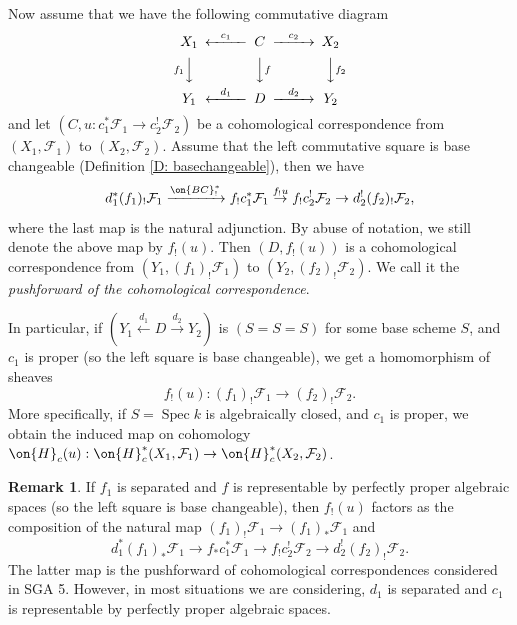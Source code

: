 \documentclass[11pt]{amsart}
\theoremstyle{definition}
\theoremstyle{definition}
\newtheorem{rmk}[thm]{Remark}
\theoremstyle{definition}
\numberwithin{equation}{subsection}
\newcommand{\mF}{{\mathcal F}}
\DeclareMathOperator{\Spec}{Spec}
\begin{document}
Now assume that we have the following commutative diagram
\[\begin{CD}
X_1@<c_1<< C@>c_2>> X_2\\
@Vf_1VV@VVfV@VVf_2V\\
Y_1@<d_1<<D@>d_2>>Y_2
\end{CD}\]
and let $(C, u:c_1^*\mF_1\to c_2^!\mF_2)$ be a cohomological correspondence from $(X_1,\mF_1)$ to $(X_2,\mF_2)$. 
Assume that the left commutative square is base changeable (Definition \ref{D: basechangeable}), then we have 
\begin{equation}
\label{ASS:pushforward correspondence}
d_1^*(f_1)_!\mF_1\xrightarrow{\on{BC}^*_!} f_!c_1^*\mF_1\stackrel{f_!u}{\to} f_!c_2^!\mF_2\to d_2^!(f_2)_!\mF_2,
\end{equation}
where the last map is the natural adjunction.
By abuse of notation, we still denote the above map by $f_!(u)$. Then $(D,f_!(u))$ is a cohomological correspondence from $(Y_1,(f_1)_!\mF_1)$ to $(Y_2,(f_2)_!\mF_2)$. We call it the \emph{pushforward of the cohomological correspondence}.


In particular, if $(Y_1\xleftarrow{d_1} D\xrightarrow{d_2} Y_2)$ is $(S=S=S)$ for some base scheme $S$, and $c_1$ is proper (so the left square is base changeable), we get a homomorphism of  sheaves
\[f_!(u): (f_1)_!\mF_1\to (f_2)_!\mF_2.\]
More specifically, if $S=\Spec k$ is algebraically closed, and $c_1$ is proper, we obtain the induced map on cohomology
$\on{H}_c(u): \on{H}_c^*(X_1,\mF_1)\to \on{H}_c^*(X_2,\mF_2)$.


\begin{rmk}
If $f_1$ is separated and $f$ is representable by perfectly proper algebraic spaces (so the left square is base changeable), then $f_!(u)$ factors as the composition of the natural map $(f_1)_!\mF_1\to (f_1)_*\mF_1$ and
\[d_1^*(f_1)_*\mF_1\to f_*c_1^*\mF_1\to f_!c_2^!\mF_2\to d_2^!(f_2)_!\mF_2.\]
The latter map is the pushforward of cohomological correspondences considered in SGA 5. However, in most situations we are considering, $d_1$ is separated and $c_1$ is representable by perfectly proper algebraic spaces.
\end{rmk}
\end{document}
